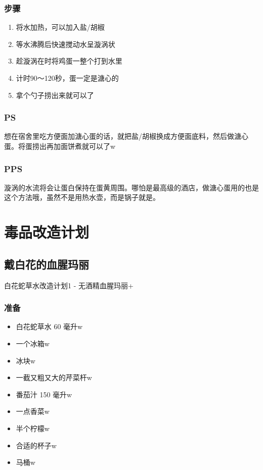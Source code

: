 \documentclass[12pt, a4paper]{ctexart}
\begin{document}
\subsubsection{步骤}
\begin{enumerate}[start=0]
    \item{将水加热，可以加入盐/胡椒}
    \item{等水沸腾后快速搅动水呈漩涡状}
    \item{趁漩涡在时将鸡蛋一整个打到水里}
    \item{计时90～120秒，蛋一定是溏心的}
    \item{拿个勺子捞出来就可以了}
\end{enumerate}

\subsubsection{PS}
想在宿舍里吃方便面加溏心蛋的话，就把盐/胡椒换成方便面底料，然后做溏心蛋。将蛋捞出再加面饼煮就可以了w

\subsubsection{PPS}
漩涡的水流将会让蛋白保持在蛋黄周围。哪怕是最高级的酒店，做溏心蛋用的也是这个方法哦，虽然不是用热水壶，而是锅子就是。

\newpage
\section{毒品改造计划}

\subsection{戴白花的血腥玛丽}
白花蛇草水改造计划1 - 无酒精血腥玛丽+

\subsubsection{准备}
\begin{itemize}
    \item{白花蛇草水 60 毫升w}
    \item{一个冰箱w}
    \item{冰块w}
    \item{一截又粗又大的芹菜杆w}
    \item{番茄汁 150 毫升w}
    \item{一点香菜w}
    \item{半个柠檬w}
    \item{合适的杯子w}
    \item{马桶w}
\end{itemize}
\end{document}
